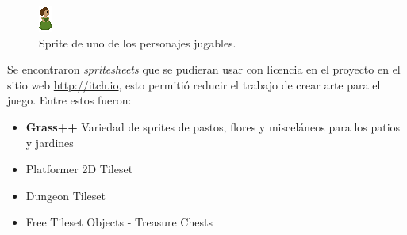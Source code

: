 \begin{figure}
    \centering
    \includegraphics[width=0.25\linewidth]{images/JohannaOrdonez.png}
    \caption{Sprite de uno de los personajes jugables.}
    \label{fig:sprite_johanna}
\end{figure}

Se encontraron \textit{spritesheets} que se pudieran usar con licencia en el proyecto en el sitio web \url{http://itch.io}, esto permitió reducir el trabajo de crear arte para el juego.
Entre estos fueron:
\begin{itemize}
    \item \textbf{Grass++} Variedad de sprites de pastos, flores y misceláneos para los patios y jardines
    \item Platformer 2D Tileset
    \item Dungeon Tileset
    \item Free Tileset Objects - Treasure Chests
\end{itemize}


